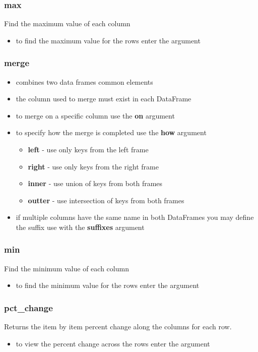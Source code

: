 %
\subsubsection{max}
Find the maximum value of each column
  \begin{itemize}

    \item to find the maximum value for the rows enter the argument
      \color{red}{axis=1}
  \end{itemize}

%
\subsubsection{merge}
  \begin{itemize}
    \item combines two data frames common elements
    \item the column used to merge must exist in each DataFrame
    \item to merge on a specific column use the \textbf{on} argument
    \item to specify how the merge is completed use the \textbf{how} argument
      \begin{itemize}
        \item \textbf{left} - use only keys from the left frame
        \item \textbf{right} - use only keys from the right frame
        \item \textbf{inner} - use union of keys from both frames
        \item \textbf{outter} - use intersection of keys from both frames
      \end{itemize}
    \item if multiple columns have the same name in both DataFrames you may
      define the suffix use with the \textbf{suffixes} argument
  \end{itemize}

%
\subsubsection{min}
Find the minimum value of each column
  \begin{itemize}

    \item to find the minimum value for the rows enter the argument
      \color{red}{axis=1}
  \end{itemize}

%
\subsubsection{pct\_change}
Returns the item by item percent change along the columns for each row.
  \begin{itemize}

    \item to view the percent change across the rows enter the argument
      \color{red}{axis=1}
  \end{itemize}

